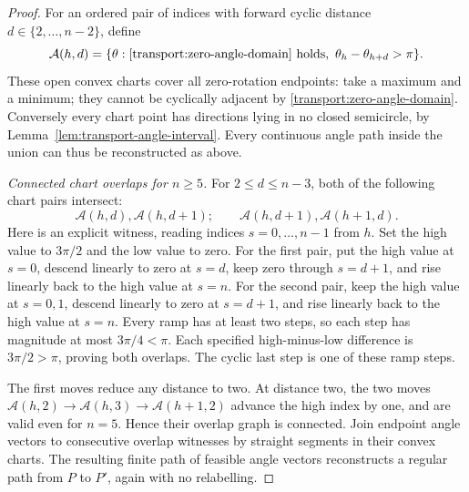 \begin{proof}
For an ordered pair of indices with forward cyclic distance
$d\in\{2,\ldots,n-2\}$, define
\begin{equation}\label{transport:chart}
 \mathcal A(h,d)=\{\theta:\eqref{transport:zero-angle-domain}\text{ holds},
                  \ \theta_h-\theta_{h+d}>\pi\}.
\end{equation}
These open convex charts cover all zero-rotation endpoints: take a maximum
and a minimum; they cannot be cyclically adjacent by
\eqref{transport:zero-angle-domain}. Conversely every chart point has
directions lying in no closed semicircle, by
Lemma~\ref{lem:transport-angle-interval}. Every continuous angle path inside
the union can thus be reconstructed as above.

\emph{Connected chart overlaps for $n\geq5$.}
For $2\leq d\leq n-3$, both of the following chart pairs intersect:
\begin{equation}\label{transport:chart-moves}
 \mathcal A(h,d),\mathcal A(h,d+1);
 \qquad \mathcal A(h,d+1),\mathcal A(h+1,d).
\end{equation}
Here is an explicit witness, reading indices $s=0,\ldots,n-1$ from $h$.
Set the high value to $3\pi/2$ and the low value to zero. For the first pair,
put the high value at $s=0$, descend linearly to zero at $s=d$, keep zero
through $s=d+1$, and rise linearly back to the high value at $s=n$.
For the second pair, keep the high value at $s=0,1$, descend linearly to zero
at $s=d+1$, and rise linearly back to the high value at $s=n$.
Every ramp has at least two steps, so each step has magnitude at most
$3\pi/4<\pi$. Each specified high-minus-low difference is $3\pi/2>\pi$,
proving both overlaps. The cyclic last step is one of these ramp steps.

The first moves reduce any distance to two. At distance two, the two moves
$\mathcal A(h,2)\to\mathcal A(h,3)\to\mathcal A(h+1,2)$ advance the high
index by one, and are valid even for $n=5$. Hence their overlap graph is
connected. Join endpoint angle vectors to consecutive overlap witnesses by
straight segments in their convex charts. The resulting finite path of
feasible angle vectors reconstructs a regular path from $P$ to $P'$, again
with no relabelling.


\end{proof}
